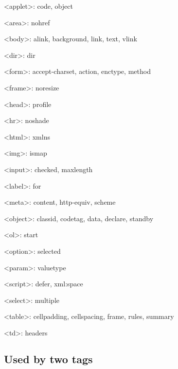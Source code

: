 \begin{compactitem}
\item <applet>: code, object
\item <area>: nohref
\item <body>: alink, background, link, text, vlink
\item <dir>: dir
\item <form>: accept-charset, action, enctype, method
\item <frame>: noresize
\item <head>: profile
\item <hr>: noshade
\item <html>: xmlns
\item <img>: ismap
\item <input>: checked, maxlength
\item <label>: for
\item <meta>: content, http-equiv, scheme
\item <object>: classid, codetag, data, declare, standby
\item <ol>: start
\item <option>: selected
\item <param>: valuetype
\item <script>: defer, xml:space
\item <select>: multiple
\item <table>: cellpadding, cellspacing, frame, rules, summary
\item <td>: headers
\end{compactitem}





\subsection{Used by two tags}

